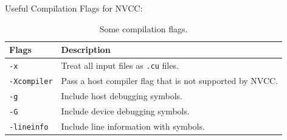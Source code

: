 \highspace
Useful Compilation Flags for NVCC:
\begin{table}[!htp]
   \centering
   \begin{tabular}{@{} l p{20em} @{}}
      \toprule
      \textbf{Flags} & \textbf{Description} \\
      \midrule
      \texttt{-x}          & Treat all input files as \texttt{.cu} files. \\
      \texttt{-Xcompiler}  & Pass a host compiler flag that is not supported by NVCC. \\
      \texttt{-g}          & Include host debugging symbols. \\
      \texttt{-G}          & Include device debugging symbols. \\
      \texttt{-lineinfo}   & Include line information with symbols. \\
      \bottomrule
   \end{tabular}
   \caption{Some compilation flags.}
\end{table}


\newpage


